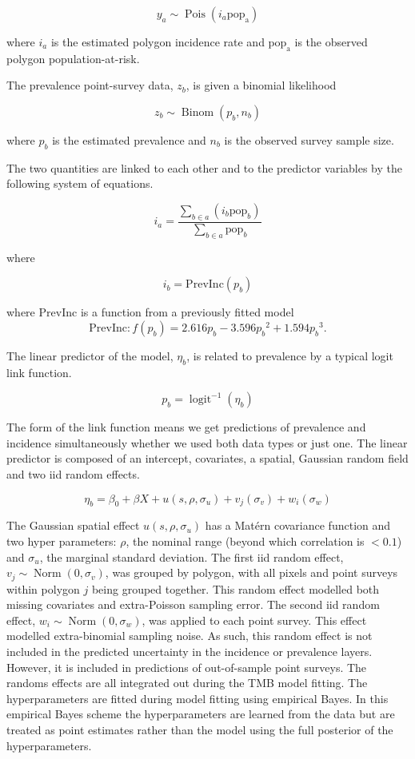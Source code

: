 \documentclass[10pt,letterpaper]{article}
\begin{document}
$$y_a \sim \operatorname{Pois}(i_a\mathrm{pop_a})$$

where $i_a$ is the estimated polygon incidence rate and $\mathrm{pop_a}$ is the observed polygon population-at-risk.

The prevalence point-survey data, $z_b$, is given a binomial likelihood

$$z_b \sim \operatorname{Binom}(p_b, n_b) $$

where $p_b$ is the estimated prevalence and $n_b$ is the observed survey sample size. 

The two quantities are linked to each other and to the predictor variables by the following system of equations.

$$i_a = \frac{ \sum_{b \in a}(i_b \mathrm{pop}_b)}{\sum_{b \in a}\mathrm{pop}_b} $$

where

$$i_b = \mathrm{PrevInc}(p_b)$$

where $\mathrm{PrevInc}$ is a function from a previously fitted model \cite{cameron2015defining} 
$$\mathrm{PrevInc}: f\left(p_b\right) = 2.616p_b - 3.596{p_b}^2 + 1.594{p_b}^3.$$

The linear predictor of the model, $\eta_b$, is related to prevalence by a typical logit link function.

$$p_b = \operatorname{logit}^{-1}(\eta_b)$$


The form of the link function means we get predictions of prevalence and incidence simultaneously whether we used both data types or just one.
The linear predictor is composed of an intercept, covariates, a spatial, Gaussian random field and two iid random effects.

$$\eta_b = \beta_0 + \beta X  + u(s, \rho, \sigma_u) + v_j(\sigma_v) + w_i(\sigma_w)$$

The Gaussian spatial effect $u(s, \rho, \sigma_u)$ has a Mat\'ern covariance function and two hyper parameters: $\rho$, the nominal range (beyond which correlation is $< 0.1$) and $\sigma_u$, the marginal standard deviation.
The first iid random effect, $v_j \sim \operatorname{Norm}(0, \sigma_v)$,  was grouped by polygon, with all pixels and point surveys within polygon $j$ being grouped together.
This random effect modelled both missing covariates and extra-Poisson sampling error. 
The second iid random effect, $w_i \sim \operatorname{Norm}(0, \sigma_w)$, was applied to each point survey.
This effect modelled extra-binomial sampling noise.
As such, this random effect is not included in the predicted uncertainty in the incidence or prevalence layers.
However, it is included in predictions of out-of-sample point surveys.
The randoms effects are all integrated out during the TMB model fitting.
The hyperparameters are fitted during model fitting using empirical Bayes.
In this empirical Bayes scheme the hyperparameters are learned from the data but are treated as point estimates rather than the model using the full posterior of the hyperparameters.
\end{document}

